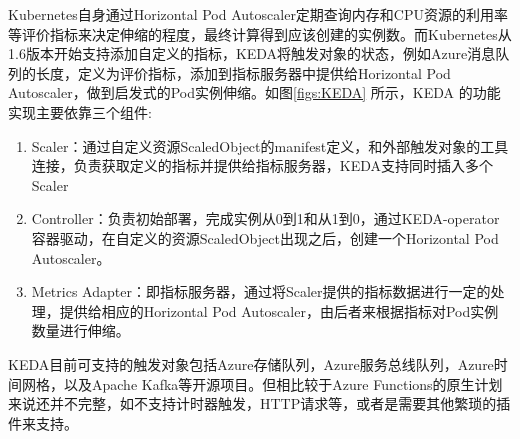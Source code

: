 \documentclass[11pt]{article}
\begin{document}
Kubernetes自身通过Horizo​​ntal Pod Autoscaler定期查询内存和CPU资源的利用率等评价指标来决定伸缩的程度，最终计算得到应该创建的实例数。而Kubernetes从1.6版本开始支持添加自定义的指标，KEDA将触发对象的状态，例如Azure消息队列的长度，定义为评价指标，添加到指标服务器中提供给Horizo​​ntal Pod Autoscaler，做到启发式的Pod实例伸缩。如图\ref{figs:KEDA} 所示，KEDA 的功能实现主要依靠三个组件:
\begin{enumerate}
    \item Scaler：通过自定义资源ScaledObject的manifest定义，和外部触发对象的工具连接，负责获取定义的指标并提供给指标服务器，KEDA支持同时插入多个Scaler
    \item Controller：负责初始部署，完成实例从0到1和从1到0，通过KEDA-operator容器驱动，在自定义的资源ScaledObject出现之后，创建一个Horizo​​ntal Pod Autoscaler。
    \item Metrics Adapter：即指标服务器，通过将Scaler提供的指标数据进行一定的处理，提供给相应的Horizo​​ntal Pod Autoscaler，由后者来根据指标对Pod实例数量进行伸缩。
\end{enumerate}
KEDA目前可支持的触发对象包括Azure存储队列，Azure服务总线队列，Azure时间网格，以及Apache Kafka等开源项目。但相比较于Azure Functions的原生计划来说还并不完整，如不支持计时器触发，HTTP请求等，或者是需要其他繁琐的插件来支持。


\end{document}
